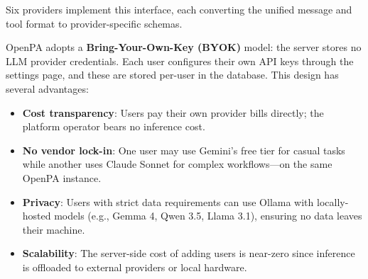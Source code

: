 Six providers implement this interface, each converting the unified message and tool format to provider-specific schemas.

OpenPA adopts a \textbf{Bring-Your-Own-Key (BYOK)} model: the server stores no LLM provider credentials. Each user configures their own API keys through the settings page, and these are stored per-user in the database. This design has several advantages:

\begin{itemize}[leftmargin=*]
  \item \textbf{Cost transparency}: Users pay their own provider bills directly; the platform operator bears no inference cost.
  \item \textbf{No vendor lock-in}: One user may use Gemini's free tier for casual tasks while another uses Claude Sonnet for complex workflows---on the same OpenPA instance.
  \item \textbf{Privacy}: Users with strict data requirements can use Ollama \cite{ollama2024} with locally-hosted models (e.g., Gemma 4, Qwen 3.5, Llama 3.1), ensuring no data leaves their machine.
  \item \textbf{Scalability}: The server-side cost of adding users is near-zero since inference is offloaded to external providers or local hardware.
\end{itemize}
